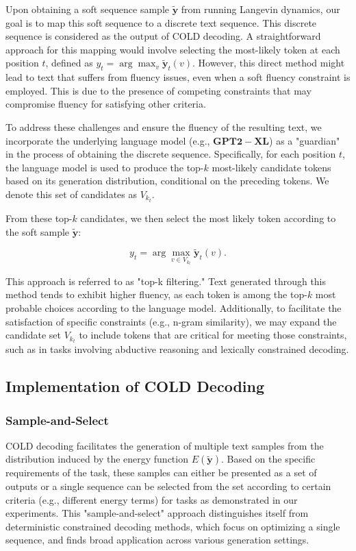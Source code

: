 \documentclass{article}
\begin{document}
Upon obtaining a soft sequence sample \(\mathbf{\tilde{y}}\) from running Langevin dynamics, our goal is to map this soft sequence to a discrete text sequence. This discrete sequence is considered as the output of COLD decoding. A straightforward approach for this mapping would involve selecting the most-likely token at each position \(t\), defined as \(y_t = \arg\max_v \mathbf{\tilde{y}}_t(v)\). However, this direct method might lead to text that suffers from fluency issues, even when a soft fluency constraint is employed. This is due to the presence of competing constraints that may compromise fluency for satisfying other criteria.

To address these challenges and ensure the fluency of the resulting text, we incorporate the underlying language model (e.g., \( \mathbf{GPT2-XL} \)) as a "guardian" in the process of obtaining the discrete sequence. Specifically, for each position \(t\), the language model is used to produce the top-\(k\) most-likely candidate tokens based on its generation distribution, conditional on the preceding tokens. We denote this set of candidates as \(V_{k_t}\).

From these top-\(k\) candidates, we then select the most likely token according to the soft sample \(\mathbf{\tilde{y}}\):

\begin{equation}
y_t = \arg\max_{v \in V_{k_t}} \mathbf{\tilde{y}}_t(v).
\end{equation}

This approach is referred to as "top-k filtering." Text generated through this method tends to exhibit higher fluency, as each token is among the top-\(k\) most probable choices according to the language model. Additionally, to facilitate the satisfaction of specific constraints (e.g., n-gram similarity), we may expand the candidate set \(V_{k_t}\) to include tokens that are critical for meeting those constraints, such as in tasks involving abductive reasoning and lexically constrained decoding.

\subsection{Implementation of COLD Decoding}

\subsubsection*{Sample-and-Select}
COLD decoding facilitates the generation of multiple text samples from the distribution induced by the energy function \(E(\mathbf{\tilde{y}})\). Based on the specific requirements of the task, these samples can either be presented as a set of outputs or a single sequence can be selected from the set according to certain criteria (e.g., different energy terms) for tasks as demonstrated in our experiments. This "sample-and-select" approach distinguishes itself from deterministic constrained decoding methods, which focus on optimizing a single sequence, and finds broad application across various generation settings.
\end{document}
